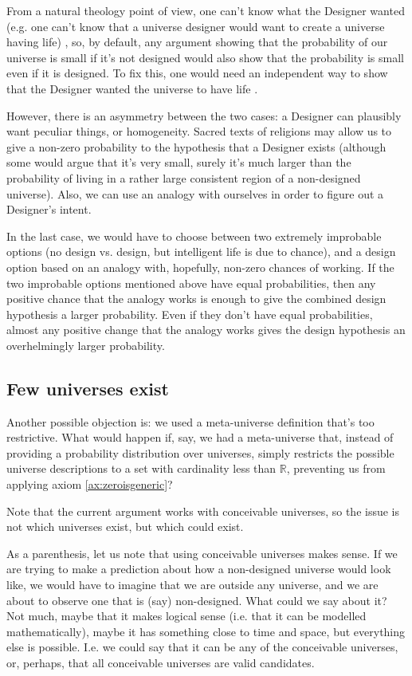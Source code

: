 \documentclass[a4paper
,draft
]{article}
\def\reale{\mathbb{R}}
\begin{document}
From a natural theology point of view, one can't
know what the Designer wanted
(e.g. one can't know that a universe designer would want to create
a universe having life) \parencites{Sober2009}{Narveson2003}, so, by default,
any argument showing that the probability of our universe is small
if it's not designed would also show that the probability is small
even if it is designed.
To fix this, one would need an independent way to show that the Designer
wanted the universe to have life \parencite{Sober2003}.

However, there is an asymmetry between the two cases: a Designer can plausibly
want peculiar things, or homogeneity.
Sacred texts of religions may allow us to give a non-zero probability to
the hypothesis that a Designer exists (although some would argue that it's
very small, surely it's much larger than the probability of living in
a rather large consistent region of a non-designed universe).
Also, we can use an analogy with
ourselves in order to figure out a Designer's intent.

In the last case, we would have to
choose between two extremely improbable options
(no design vs. design, but intelligent life is due to chance),
and a design option based on an analogy with, hopefully,
non-zero chances of working.
If the two improbable options mentioned above have equal probabilities, then
any positive chance that the analogy
works is enough to give the combined design hypothesis a larger probability.
Even if they don't have equal probabilities, almost any positive change
that the analogy works gives the design hypothesis an overhelmingly larger
probability.

\subsection{Few universes exist}
\label{sec:fewuniverses}

Another possible objection is: we used a meta-universe definition that's too
restrictive. What would happen if, say, we had a meta-universe that, instead
of providing a probability distribution over universes, simply restricts the
possible universe descriptions to a set with cardinality less than $\reale$,
preventing us from applying axiom \ref{ax:zeroisgeneric}?

Note that the current argument works with conceivable universes, so the issue
is not which universes exist, but which could exist.

As a parenthesis, let us note that using conceivable universes makes sense.
If we are
trying to make a prediction about how a non-designed universe would
look like, we would have to imagine that we are outside any universe, and we are
about to observe one that is (say) non-designed. What could we say about it?
Not much, maybe that it makes logical sense (i.e. that it can be modelled
mathematically), maybe it has something close to time and space, but
everything else is possible.
I.e. we could say that it can be any
of the conceivable universes, or, perhaps,
that all conceivable universes are valid candidates.
\end{document}

